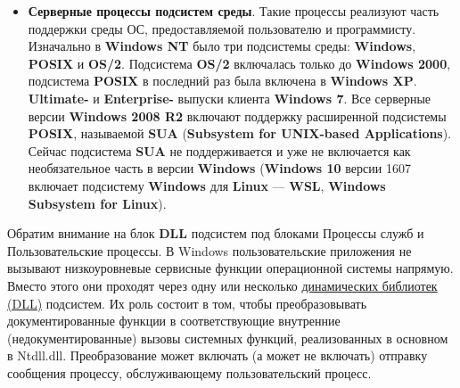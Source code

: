 \documentclass[14pt, a4paper]{article}
\begin{document}
\begin{itemize}
    \item \textbf{Серверные процессы подсистем среды}. Такие процессы реализуют часть поддержки среды ОС,
    предоставляемой пользователю и программисту. Изначально в \textbf{Windows NT} было три подсистемы
    среды: \textbf{Windows}, \textbf{POSIX} и \textbf{OS/2}. Подсистема \textbf{OS/2} включалась только до \textbf{Windows 2000}, подсистема
    \textbf{POSIX} в последний раз была включена в \textbf{Windows XP}. \textbf{Ultimate-} и \textbf{Enterprise-} выпуски клиента
    \textbf{Windows 7}. Все серверные версии \textbf{Windows 2008 R2} включают поддержку расширенной подсистемы \textbf{POSIX},
    называемой \textbf{SUA} (\textbf{Subsystem for UNIX-based Applications}). Сейчас подсистема \textbf{SUA} не поддерживается
    и уже не включается как необязательное часть в версии \linebreak[4]\textbf{Windows} (\textbf{Windows 10} версии 1607 включает
    подсистему \textbf{Windows} для \textbf{Linux} — \textbf{WSL}, \textbf{Windows Subsystem for Linux}).
\end{itemize}


Обратим внимание на блок \textbf{DLL} подсистем под блоками Процессы служб и Пользовательские процессы.
В Windows пользовательские приложения не вызывают низкоуровневые сервисные функции операционной
системы напрямую. Вместо этого они проходят через одну или несколько \underline{динамических библиотек
(DLL)} подсистем. Их роль состоит в том, чтобы преобразовывать документированные функции в
соответствующие внутренние (недокументированные) вызовы системных функций, реализованных в
основном в Ntdll.dll. Преобразование может включать (а может не включать) отправку сообщения
процессу, обслуживающему пользовательский процесс.\\
\end{document}
